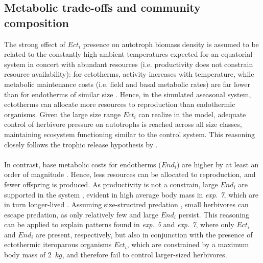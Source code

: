\subsection{Metabolic trade-offs and community composition}
The strong effect of $Ect_i$ presence on autotroph biomass density is assumed to be related to the constantly high ambient temperatures expected for an equatorial system in concert with abundant resources (i.e. productivity does not constrain resource availability): for ectotherms, activity increases with temperature, while metabolic maintenance costs (i.e. field and basal metabolic rates) are  far lower than for endotherms of similar size \citep{Nagy2005,Buckley2012}. 
Hence, in the simulated aseasonal system, ectotherms can allocate more resources to reproduction than endothermic organisms. 
Given the large size range $Ect_i$ can realize in the model,  adequate control of herbivore pressure on autotrophs is reached across all size classes, maintaining ecosystem functioning similar to the control system. 
This reasoning closely follows the trophic release hypothesis by \cite{Hairston1960}. 
\\\\
In contrast, base metabolic costs for endotherms ($End_i$) are higher by at least an order of magnitude \citep{Nagy2005}. 
Hence, less resources can be allocated to reproduction, and fewer offspring is produced. 
As productivity is not a constrain, large $End_i$ are supported in the system \citep{Smith2011}, evident in high average body mass in \textit{exp. 7}, which are in turn longer-lived \citep{Speakman2005}. 
Assuming size-structred predation \citep{Williams2010}, small herbivores can escape predation, as only relatively few and large $End_i$ persist. 
This reasoning can be applied to explain patterns found in \textit{exp. 5} and \textit{exp. 7}, where only $Ect_i$ and $End_i$ are present, respectively, but also in conjunction with the presence of ectothermic iteroparous organisms  $Ect_i$, which are constrained by a maximum body mass of 2~$kg$, and therefore fail to control larger-sized herbivores. 




